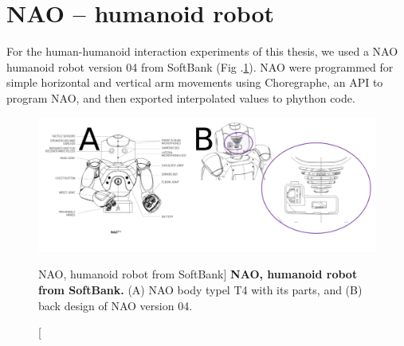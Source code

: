 \newpage
\section{NAO -- humanoid robot}  \label{appendix:nao}
For the human-humanoid interaction experiments of this thesis, 
we used a NAO humanoid robot version 04 from SoftBank (Fig .\ref{fig:nao}).
NAO were programmed for simple horizontal and vertical arm movements
using Choregraphe, an API to program NAO, and then exported interpolated 
values to phython code.
\begin{figure}
 \centering
   \includegraphics[width=1.0\textwidth]{nao}
   \caption
	[NAO, humanoid robot from SoftBank]{
	{\bf NAO, humanoid robot from SoftBank.}
		(A) NAO body typel T4 with its parts, and 
		(B) back design of NAO version 04.
}
   \label{fig:nao}
\end{figure}








